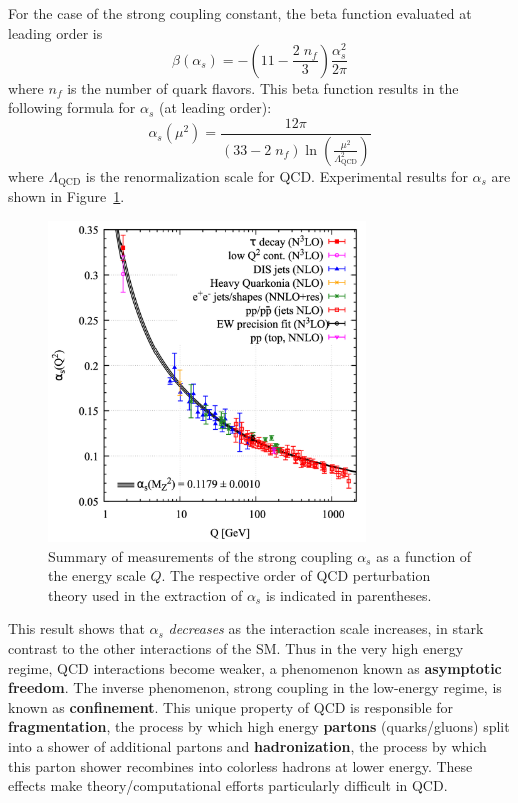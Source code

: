For the case of the strong coupling constant, the beta function evaluated at leading order is
\begin{equation}
    \beta(\alpha_s) = -\left(11 - \frac{2\; n_f}{3}\right) \frac{\alpha_s^2}{2\pi}
\end{equation}
where $n_f$ is the number of quark flavors.
This beta function results in the following formula for $\alpha_s$ (at leading order):
\begin{equation}
    \alpha_s(\mu^2) = \frac{12\pi}{(33 - 2\;n_f) \ln (\frac{\mu^2}{\Lambda_{\mathrm{QCD}}^2})}
\end{equation}
where $\Lambda_{\mathrm{QCD}}$ is the renormalization scale for QCD.
Experimental results for $\alpha_s$ are shown in Figure~\ref{fig:alpha_s_measurements}.

\begin{figure}
	\centering
	\includegraphics[width=0.75\textwidth]{alpha_s_measurements}
	\caption{
	Summary of measurements of the strong coupling $\alpha_s$ as a function of the energy scale $Q$.
	The respective order of QCD perturbation theory used in the extraction of $\alpha_s$ is indicated in parentheses.
	\cite{PDG:PhysRevD.98.030001}
	}
	\label{fig:alpha_s_measurements}
\end{figure}

This result shows that $\alpha_s$ \textit{decreases} as the interaction scale increases, in stark contrast to the other interactions of the SM.
Thus in the very high energy regime, QCD interactions become weaker, a phenomenon known as \textbf{asymptotic freedom}.
The inverse phenomenon, strong coupling in the low-energy regime, is known as \textbf{confinement}.
This unique property of QCD is responsible for \textbf{fragmentation}, the process by which high energy \textbf{partons} (quarks/gluons) split into a shower of additional partons and \textbf{hadronization}, the process by which this parton shower recombines into colorless hadrons at lower energy.
These effects make theory/computational efforts particularly difficult in QCD.

